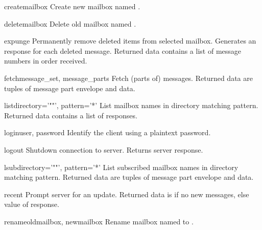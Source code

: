 \begin{methoddesc}{create}{mailbox}
  Create new mailbox named .
\end{methoddesc}

\begin{methoddesc}{delete}{mailbox}
  Delete old mailbox named .
\end{methoddesc}

\begin{methoddesc}{expunge}{}
  Permanently remove deleted items from selected mailbox. Generates an
   response for each deleted message. Returned data
  contains a list of  message numbers in order
  received.
\end{methoddesc}

\begin{methoddesc}{fetch}{message_set, message_parts}
  Fetch (parts of) messages. Returned data are tuples of message part
  envelope and data.
\end{methoddesc}

\begin{methoddesc}{list}{directory='""', pattern='*'}
  List mailbox names in directory matching pattern. Returned data contains a
  list of  responses.
\end{methoddesc}

\begin{methoddesc}{login}{user, password}
  Identify the client using a plaintext password.
\end{methoddesc}

\begin{methoddesc}{logout}{}
  Shutdown connection to server. Returns server  response.
\end{methoddesc}

\begin{methoddesc}{lsub}{directory='""', pattern='*'}
  List subscribed mailbox names in directory matching
  pattern. Returned data are tuples of message part envelope and data.
\end{methoddesc}

\begin{methoddesc}{recent}{}
  Prompt server for an update. Returned data is  if no new
  messages, else value of  response.
\end{methoddesc}

\begin{methoddesc}{rename}{oldmailbox, newmailbox}
  Rename mailbox named  to .
\end{methoddesc}


